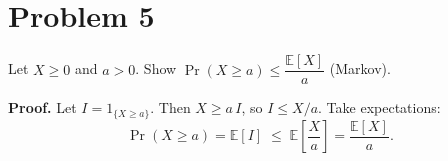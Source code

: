 \section*{Problem 5}

Let $X\ge 0$ and $a>0$. Show $\Pr(X\ge a)\le \dfrac{\mathbb{E}[X]}{a}$ (Markov).

\textbf{Proof.}
Let $I=1_{\{X\ge a\}}$. Then $X\ge a\,I$, so $I\le X/a$.
Take expectations:
\[
\Pr(X\ge a)=\mathbb{E}[I]\;\le\; \mathbb{E}\!\left[\frac{X}{a}\right]
=\frac{\mathbb{E}[X]}{a}.
\]
